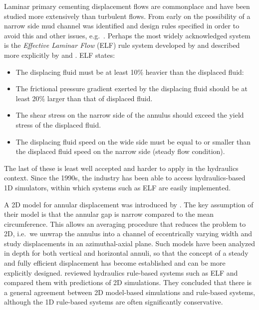 \documentclass[review]{elsarticle}
\begin{document}
Laminar primary cementing displacement flows are commonplace and have been studied more extensively than turbulent flows. From early on the possibility of a narrow side mud channel was identified \citep{Mclean1967} and design rules specified in order to avoid this and other issues, e.g.~\cite{lockyear1989}. Perhaps the most widely acknowledged system is the \emph{Effective Laminar Flow} (ELF) rule system developed by \citet{Couturier1990} and described more explicitly by \citet{brady1992} and \citet{theron2002}. ELF states:	
\begin{itemize}
		\item The displacing fluid must be at least 10\% heavier than the displaced fluid:
		\item The frictional pressure gradient exerted by the displacing fluid should be at least 20\% larger than that of displaced fluid.
		\item The shear stress on the narrow side of the annulus should exceed the yield stress of the displaced fluid.
		\item The displacing fluid speed on the wide side must be equal to or smaller than the displaced fluid speed on the narrow side (steady flow condition).	
\end{itemize}
The last of these is least well accepted and harder to apply in the hydraulics context. Since the 1990s, the industry has been able to access hydraulics-based 1D simulators, within which systems such as ELF are easily implemented.

A 2D model for annular displacement was introduced by \citet{Bittleston2002}. The key assumption of their model is that the annular gap is narrow compared to the mean circumference. This allows an averaging procedure that reduces the problem to 2D, i.e.~we unwrap the annulus into a channel of eccentrically varying width and study displacements in an azimuthal-axial plane. Such models have been analyzed in depth for both vertical \citep{Pelipenko2004a,Pelipenko2004b,Pelipenko2004c} and horizontal \citep{Carrasco2008} annuli, so that the concept of a steady and fully efficient displacement has become established and can be more explicitly designed. \cite{Pelipenko2004c} reviewed hydraulics rule-based systems such as ELF and compared them with predictions of 2D simulations. They concluded that there is a general agreement between 2D model-based simulations and rule-based systems, although the 1D rule-based systems are often significantly conservative.
\end{document}
